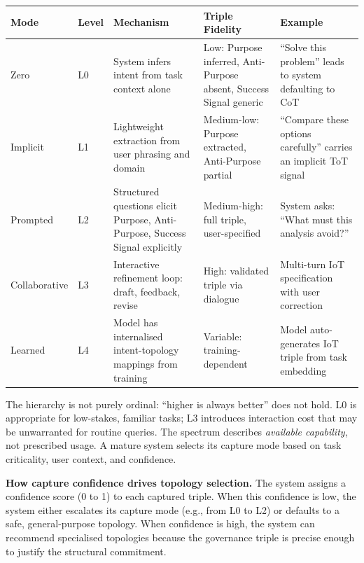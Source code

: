 \documentclass[11pt,a4paper]{article}
\begin{document}
{\small\begin{longtable}[]{@{}
  >{\raggedright\arraybackslash}p{}
  >{\raggedright\arraybackslash}p{}
  >{\raggedright\arraybackslash}p{}
  >{\raggedright\arraybackslash}p{}
  >{\raggedright\arraybackslash}p{}@{}}
\toprule\noalign{}
Mode
 & Level
 & Mechanism
 & Triple Fidelity
 & Example
 \\
\midrule\noalign{}
\endhead
\bottomrule\noalign{}
\endlastfoot
Zero & L0 & System infers intent from task context alone & Low: Purpose
inferred, Anti-Purpose absent, Success Signal generic & ``Solve this
problem'' leads to system defaulting to CoT \\
Implicit & L1 & Lightweight extraction from user phrasing and domain &
Medium-low: Purpose extracted, Anti-Purpose partial & ``Compare these
options carefully'' carries an implicit ToT signal \\
Prompted & L2 & Structured questions elicit Purpose, Anti-Purpose,
Success Signal explicitly & Medium-high: full triple, user-specified &
System asks: ``What must this analysis avoid?'' \\
Collaborative & L3 & Interactive refinement loop: draft, feedback,
revise & High: validated triple via dialogue & Multi-turn IoT
specification with user correction \\
Learned & L4 & Model has internalised intent-topology mappings from
training & Variable: training-dependent & Model auto-generates IoT
triple from task embedding \\
\end{longtable}}

The hierarchy is not purely ordinal: ``higher is always better'' does
not hold. L0 is appropriate for low-stakes, familiar tasks; L3
introduces interaction cost that may be unwarranted for routine queries.
The spectrum describes \emph{available capability}, not prescribed
usage. A mature system selects its capture mode based on task
criticality, user context, and confidence.

\textbf{How capture confidence drives topology selection.} The system
assigns a confidence score (0 to 1) to each captured triple. When this
confidence is low, the system either escalates its capture mode (e.g.,
from L0 to L2) or defaults to a safe, general-purpose topology. When
confidence is high, the system can recommend specialised topologies
because the governance triple is precise enough to justify the
structural commitment.
\end{document}
